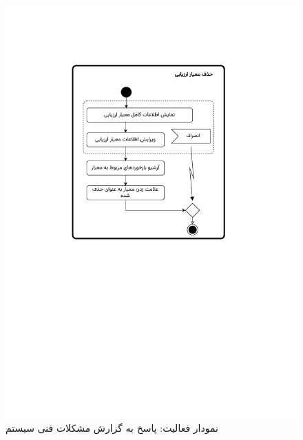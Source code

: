 \begin{figure}[ht!]
	\centering
	\includegraphics[scale=0.8, page=4]{figs/OOD-activity31-35.pdf}
	\caption{نمودار فعالیت: پاسخ به گزارش مشکلات فنی سیستم}
\end{figure}
\FloatBarrier
\newpage
